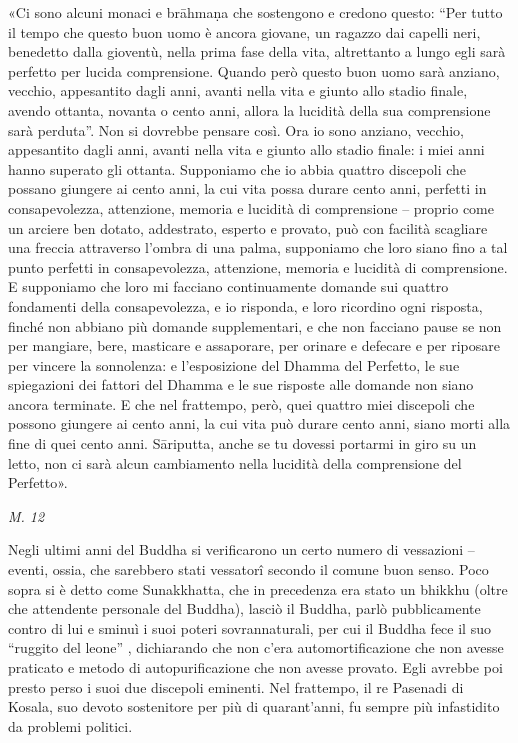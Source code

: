 «Ci sono alcuni monaci e brāhmaṇa che sostengono e credono questo: “Per
tutto il tempo che questo buon uomo è ancora giovane, un ragazzo dai
capelli neri, benedetto dalla gioventù, nella prima fase della vita,
altrettanto a lungo egli sarà perfetto per lucida comprensione. Quando
però questo buon uomo sarà anziano, vecchio, appesantito dagli anni,
avanti nella vita e giunto allo stadio finale, avendo ottanta, novanta o
cento anni, allora la lucidità della sua comprensione sarà perduta”. Non
si dovrebbe pensare così. Ora io sono anziano, vecchio, appesantito
dagli anni, avanti nella vita e giunto allo stadio finale: i miei anni
hanno superato gli ottanta. Supponiamo che io abbia quattro discepoli
che possano giungere ai cento anni, la cui vita possa durare cento anni,
perfetti in consapevolezza, attenzione, memoria e lucidità di
comprensione – proprio come un arciere ben dotato, addestrato, esperto e
provato, può con facilità scagliare una freccia attraverso l’ombra di
una palma, supponiamo che loro siano fino a tal punto perfetti in
consapevolezza, attenzione, memoria e lucidità di comprensione. E
supponiamo che loro mi facciano continuamente domande sui quattro
fondamenti della consapevolezza, e io risponda, e loro ricordino ogni
risposta, finché non abbiano più domande supplementari, e che non
facciano pause se non per mangiare, bere, masticare e assaporare, per
orinare e defecare e per riposare per vincere la sonnolenza: e
l’esposizione del Dhamma del Perfetto, le sue spiegazioni dei fattori
del Dhamma e le sue risposte alle domande non siano ancora terminate. E
che nel frattempo, però, quei quattro miei discepoli che possono
giungere ai cento anni, la cui vita può durare cento anni, siano morti
alla fine di quei cento anni. Sāriputta, anche se tu dovessi portarmi in
giro su un letto, non ci sarà alcun cambiamento nella lucidità della
comprensione del Perfetto».


\emph{M. 12}


 Negli ultimi anni del Buddha si verificarono un certo
numero di vessazioni – eventi, ossia, che sarebbero stati vessatorî
secondo il comune buon senso. Poco sopra si è detto come Sunakkhatta,
che in precedenza era stato un bhikkhu (oltre che attendente personale
del Buddha), lasciò il Buddha, parlò pubblicamente contro di lui e
sminuì i suoi poteri sovrannaturali, per cui il Buddha fece il suo
“ruggito del leone” , dichiarando che non c’era automortificazione che
non avesse praticato e metodo di autopurificazione che non avesse
provato. Egli avrebbe poi presto perso i suoi due discepoli eminenti.
Nel frattempo, il re Pasenadi di Kosala, suo devoto sostenitore per più
di quarant’anni, fu sempre più infastidito da problemi politici.


